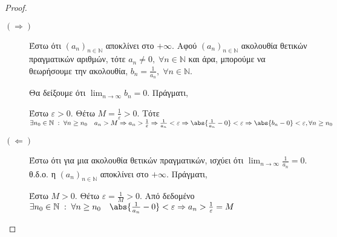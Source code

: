 \documentclass[main.tex]{subfiles}
\begin{document}






\begin{proof}
\item {}
  \begin{description}
    \item[$ (\Rightarrow) $] Έστω ότι $ (a_{n})_{n \in \mathbb{N}} $ 
      αποκλίνει στο $ + \infty $. Αφού $ (a_{n})_{n \in \mathbb{N}} $
      ακολουθία θετικών πραγματικών αριθμών, τότε $ a_{n} \neq 0, 
      \; \forall n \in \mathbb{N}$ και άρα, μπορούμε να θεωρήσουμε 
      την ακολουθία, $ b_{n} = \frac{1}{a_{n}}, \; \forall n \in
      \mathbb{N}  $. 

      Θα δείξουμε ότι $ \lim_{n \to \infty} b_{n} = 0 $. Πράγματι,

      Έστω $ \varepsilon >0 $. Θέτω $ M = \frac{1}{\varepsilon} >0 $.
      Τότε $ \exists n_{0} \in \mathbb{N} \; : \; \forall n \geq 
      n_{0} \quad a_{n}> M \Rightarrow a_{n} > \frac{1}{\varepsilon} 
      \Rightarrow \frac{1}{a_{n}} < \varepsilon \Rightarrow
      \abs{\frac{1}{a_{n}} - 0} < \varepsilon \Rightarrow 
      \abs{b_{n}-0} < \varepsilon, \forall n \geq n_{0} $

    \item [$ ( \Leftarrow) $]
      Έστω ότι για μια ακολουθία θετικών πραγματικών, ισχύει ότι 
      $ \lim_{n \to \infty} \frac{1}{a_{n}} = 0$. θ.δ.ο. η $ 
      (a_{n})_{n \in \mathbb{N}}$ αποκλίνει στο $ + \infty $. Πράγματι,

      Έστω $ M > 0 $. Θέτω $ \varepsilon = \frac{1}{M} > 0 $. Από 
      δεδομένο $ \exists n_{0} \in \mathbb{N} \; : \; \forall n \geq 
      n_{0} \quad \abs{\frac{1}{a_{n}} - 0} < \varepsilon \Rightarrow
      a_{n} > \frac{1}{\varepsilon}=M $
  \end{description}
\end{proof}
\end{document}
